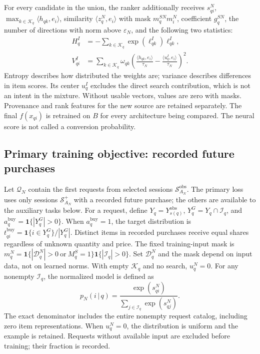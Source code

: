 \documentclass[12pt,a4paper]{article}
\newcommand{\ind}{\mathbf 1}
\newcommand{\eps}{\varepsilon}
\newcommand{\given}{\,\vert\,}
\theoremstyle{plainru}
\begin{document}
For every candidate in the union, the ranker additionally receives
$s_{qi}^{N}$, $\max_{k\in\mathcal K_q}\langle h_{qk},e_i\rangle$,
similarity $\langle z_q^N,e_i\rangle$ with mask $m_q^{SN}m_i^N$,
coefficient $g_q^{SN}$,
the number of directions with norm above $\eps_N$, and the following two statistics:
\begin{align}\label{eq:modern-ranking-features}
H_q^I&=-\sum_{k\in\mathcal K_q}\exp(\ell_{qk}^{I})\ell_{qk}^{I},\\
V_{qi}^{I}&=\sum_{k\in\mathcal K_q}\omega_{qk}
\left(\frac{\langle h_{qk},e_i\rangle}{\tau_N}
-\frac{\langle u_q^I,e_i\rangle}{\tau_N}\right)^2.
\nonumber
\end{align}
Entropy describes how distributed the weights are; variance describes differences
in item scores. Its center $u_q^I$ excludes the direct search contribution,
which is not an intent in the mixture.
Without usable vectors, values are zero with masks.
Provenance and rank features for the new source are retained separately.
The final $f(x_{qi})$ is retrained on $B$ for every architecture
being compared. The neural score is not called a conversion probability.

\subsection{Primary training objective: recorded future purchases}
\label{sec:modern-objective}

Let $\mathcal Q_N$ contain the first requests from selected sessions
$\mathcal S_{A_N}^{\mathrm{obs}}$. The primary loss uses only sessions
$\mathcal S_{A_N}^{+}$ with a recorded future purchase;
the others are available to the auxiliary tasks below. For a request, define
$Y_q=Y_{s(q)}^{\mathrm{obs}}$, $Y_q^G=Y_q\cap\mathcal I_q$, and
$a_q^{\mathrm{buy}}=\ind\{|Y_q^G|>0\}$.
When $a_q^{\mathrm{buy}}=1$, the target distribution is
$t_{qi}^{\mathrm{buy}}=\ind\{i\in Y_q^G\}/|Y_q^G|$.
Distinct items in recorded purchases receive equal shares regardless
of unknown quantity and price.
The fixed training-input mask is
$m_q^N=\ind\{|\mathcal D_q^N|>0\ \text{or}\ M_q^S=1\}
\ind\{|\mathcal I_q|>0\}$.
Set $\mathcal D_q^N$ and the mask depend on input data,
not on learned norms.
With empty $\mathcal K_q$ and no search, $u_q^N=0$.
For any nonempty $\mathcal I_q$, the normalized model is defined as
\begin{equation}\label{eq:modern-softmax}
p_N(i\given q)=\frac{\exp(s_{qi}^{N})}
{\sum_{j\in\mathcal I_q}\exp(s_{qj}^{N})}.
\end{equation}
The exact denominator includes the entire nonempty request catalog,
including zero item representations. When $u_q^N=0$, the distribution
is uniform and the example is retained. Requests without available input
are excluded before training; their fraction is recorded.
\end{document}

